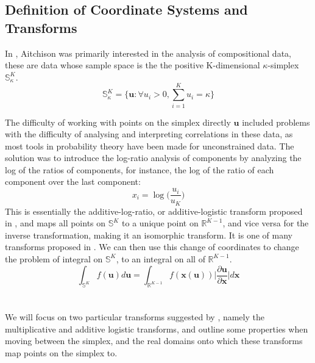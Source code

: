 \subsection{Definition of Coordinate Systems and Transforms} \label{sec:transform_def}

In \cite{Aitchison1982TheData}, Aitchison was primarily interested in the analysis of compositional data, these are data whose sample space is the the positive K-dimensional \(\kappa\)-simplex \(\mathbb{S}_{\kappa}^K\). 
\begin{equation*}
    \mathbb{S}_{\kappa}^K = \bigg  \{ \mathbf{u} : \forall u_i > 0, \sum_{i=1}^K u_i = \kappa \bigg \}
\end{equation*}

The difficulty of working with points on the simplex directly \(\mathbf{u}\) included problems with the difficulty of analysing and interpreting correlations in these data, as most tools in probability theory have been made for unconstrained data. The solution was to introduce the log-ratio analysis of components by analyzing the log of the ratios of components, for instance, the log of the ratio of each component over the last component:
\[ x_i = \log \bigg( \frac{u_i}{u_K} \bigg) \]
This is essentially the additive-log-ratio, or additive-logistic transform proposed in \cite{Aitchison1982TheData}, and maps all points on \(\mathbb{S}^K\) to a unique point on \(\mathbb{R}^{K-1}\), and vice versa for the inverse transformation, making it an isomorphic transform. It is one of many transforms proposed in \cite{Aitchison1982TheData}. We can then use this change of coordinates to change the problem of integral on \(\mathbb{S}^K\), to an integral on all of \(\mathbb{R}^{K-1}\).
\begin{equation*}
    \int_{\mathbb{S}^K} f(\mathbf{u}) d \mathbf{u} = \int_{\mathbb{R}^{K-1}} f(\mathbf{x(u)}) \bigg| \frac{\partial \mathbf{u}}{\partial \mathbf{x}} \bigg| d \mathbf{x}
\end{equation*}
\\\\
We will focus on two particular transforms suggested by \cite{Aitchison1982TheData}, namely the multiplicative and additive logistic transforms, and outline some properties when moving between the simplex, and the real domains onto which these transforms map points on the simplex to.
